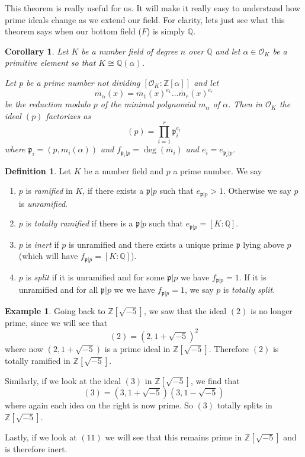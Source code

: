 \documentclass[11pt,a4paper]{report}
\theoremstyle{plain}
\newtheorem{corollary}[subsection]{Corollary}
\theoremstyle{definition}
\newtheorem{definition}[subsection]{Definition}
\newtheorem{exmp}[subsection]{Example}
\theoremstyle{definition}
\newcommand{\ZZ}{\mathbb{Z}}
\def\QQ{\mathbb{Q}}
\def\gothp{\mathfrak{p}}
\def \a{\alpha}
\def \OO {\mathcal{O}}
\def \ov{\overline}
\begin{document}
	
	
	
	This theorem is really useful for us. It will make it really easy to understand how prime ideals change as we extend our field. For clarity, lets just see what this theorem says when our bottom field ($F$) is simply $\QQ$.
	
	\begin{corollary}\label{cor: ded-kum for K/Q}
		Let $K$ be a number field of degree $n$ over $\QQ$ and let $\a \in \OO_K$ be a primitive element so that $K\cong\QQ(\a)$. 
		
		Let $p$ be a prime number not dividing $[\OO_K:\ZZ[\a]]$ and let \[\ov{m}_\a(x)=\ov{m}_1(x)^{e_1}\dots \ov{m}_r(x)^{e_r}\] be the reduction modulo $p$ of the minimal polynomial $m_\a$ of $\a$. Then in $\OO_K$ the ideal $(p)$ factorizes as \[(p)=\prod_{i=1}^r \gothp_i^{e_i}\] where $\gothp_i=(p,m_i(\a))$ and $f_{\gothp_i|p}=\deg(\ov{m}_i)$ and $e_i=e_{\gothp_i|p}$.
	\end{corollary}
	
	
	\begin{definition}
		Let $K$ be a number field and $p$ a prime number. We say
		\begin{enumerate}
			\item $p$ is \textit{ramified} in $K$, if there exists a $\gothp|p$ such that $e_{\gothp|p}>1$. Otherwise we say $p$ is \textit{unramified}.
			\item $p$ is \textit{totally ramified} if there is a $\gothp|p$ such that $e_{\gothp|p}=[K:\QQ]$.
			
			\item $p$ is \textit{inert} if $p$ is unramified and there exists a unique prime $\gothp$ lying above $p$ (which will have $f_{\gothp|p}=[K:\QQ]$).
			
			\item  $p$ is \textit{ split} if it is unramified  and for some $\gothp|p$ we have $f_{\gothp|p}=1$. If it is unramified and for all $\gothp|p$ we we have $f_{\gothp|p}=1$, we say $p$ is \textit{totally split}. 
		\end{enumerate}
	\end{definition}
	
	\begin{exmp}
		Going back to $\ZZ[\sqrt{-5}]$, we saw that the ideal $(2)$ is no longer prime, since we will see that \[(2)=(2,1+\sqrt{-5})^2\] where now $(2,1+\sqrt{-5})$ is a prime ideal in $\ZZ[\sqrt{-5}]$. Therefore $(2)$ is totally ramified in $\ZZ[\sqrt{-5}]$. 
		
		Similarly, if we look at the ideal $(3)$ in $\ZZ[\sqrt{-5}]$, we find that \[(3)=(3,1+\sqrt{-5})(3,1-\sqrt{-5})\] where again each idea on the right is now prime. So $(3)$ totally splits in $\ZZ[\sqrt{-5}]$.
		
		Lastly, if we look at $(11)$ we will see that this remains prime in $\ZZ[\sqrt{-5}]$ and is therefore inert.
		
	\end{exmp}
	
\end{document}
